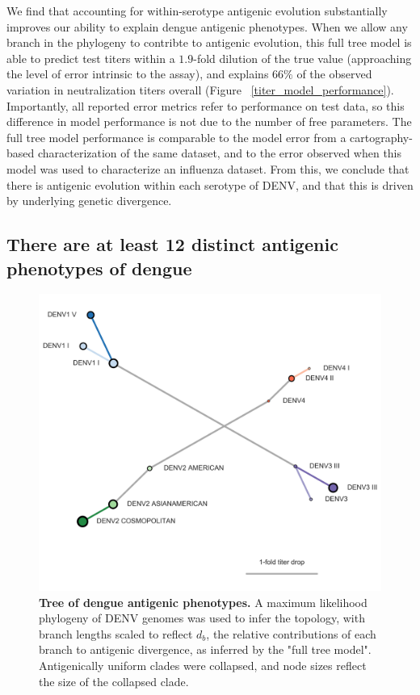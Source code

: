 \documentclass[11pt,oneside,letterpaper]{article}
\begin{document}
We find that accounting for within-serotype antigenic evolution substantially improves our ability to explain dengue antigenic phenotypes.
When we allow any branch in the phylogeny to contribte to antigenic evolution, this full tree model is able to predict test titers within a $1.9$-fold dilution of the true value (approaching the level of error intrinsic to the assay), and explains $66\%$ of the observed variation in neutralization titers overall (Figure ~\ref{titer_model_performance}).
Importantly, all reported error metrics refer to performance on test data, so this difference in model performance is not due to the number of free parameters.
The full tree model performance is comparable to the model error from a cartography-based characterization of the same dataset, and to the error observed when this model was used to characterize an influenza dataset.
From this, we conclude that there is antigenic evolution within each serotype of DENV, and that this is driven by underlying genetic divergence.


\subsection{There are at least 12 distinct antigenic phenotypes of dengue}

\begin{figure}[h]
  \begin{centering}
    \includegraphics[width=.8\linewidth]{../figures/png/antigenic_tree.png}
    \caption{\textbf{Tree of dengue antigenic phenotypes.} \linebreak A maximum likelihood phylogeny of DENV genomes was used to infer the topology, with branch lengths scaled to reflect $d_b$, the relative contributions of each branch to antigenic divergence, as inferred by the "full tree model". Antigenically uniform clades were collapsed, and node sizes reflect the size of the collapsed clade.}
     \label{antigenic_tree}
  \end{centering}
\end{figure}
\end{document}
